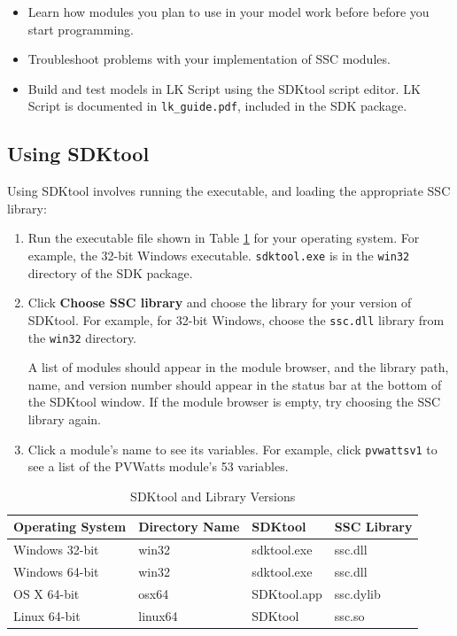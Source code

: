\documentclass{scrartcl} %
\begin{document}
\begin{itemize}
\item Learn how modules you plan to use in your model work before before you start programming.
\item Troubleshoot problems with your implementation of SSC modules.
\item Build and test models in LK Script using the SDKtool script editor. LK Script is documented in \texttt{lk\_guide.pdf}, included in the SDK package.
\end{itemize}

\subsection{Using SDKtool}
\label{sec_sdktool_run}

Using SDKtool involves running the executable, and loading the appropriate SSC library:

\begin{enumerate}
\item Run the executable file shown in Table \ref{tab_sdktool_versions} for your operating system. For example, the 32-bit Windows executable. \texttt{sdktool.exe} is in the \texttt{win32} directory of the SDK package.
\item Click \textbf{Choose SSC library} and choose the library for your version of SDKtool. For example, for 32-bit Windows, choose the \texttt{ssc.dll} library from the \texttt{win32} directory.

A list of modules should appear in the module browser, and the library path, name, and version number should appear in the status bar at the bottom of the SDKtool window. If the module browser is empty, try choosing the SSC library again.
\item Click a module's name to see its variables. For example, click \texttt{pvwattsv1} to see a list of the PVWatts module's 53 variables.
\end{enumerate}

\begin{table}
  \begin{center}
    \begin{tabular}{llll}
       Operating System & Directory Name & SDKtool & SSC Library \\
       \hline
       Windows 32-bit & win32 & sdktool.exe & ssc.dll \\
       Windows 64-bit & win32 & sdktool.exe & ssc.dll \\
       OS X 64-bit & osx64 & SDKtool.app & ssc.dylib \\
       Linux 64-bit & linux64 & SDKtool & ssc.so \\ 
      \hline
    \end{tabular}
    \caption{SDKtool and Library Versions}\label{tab_sdktool_versions}
  \end{center}
\end{table}
\end{document}
